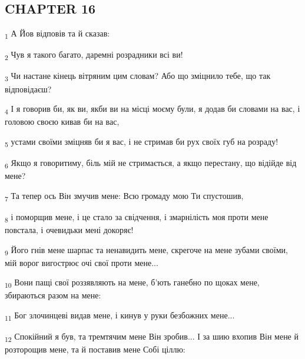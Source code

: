 \subsection{CHAPTER 16}
\begin{tcolorbox}
\textsubscript{1} А Йов відповів та й сказав:
\end{tcolorbox}
\begin{tcolorbox}
\textsubscript{2} Чув я такого багато, даремні розрадники всі ви!
\end{tcolorbox}
\begin{tcolorbox}
\textsubscript{3} Чи настане кінець вітряним цим словам? Або що зміцнило тебе, що так відповідаєш?
\end{tcolorbox}
\begin{tcolorbox}
\textsubscript{4} І я говорив би, як ви, якби ви на місці моєму були, я додав би словами на вас, і головою своєю кивав би на вас,
\end{tcolorbox}
\begin{tcolorbox}
\textsubscript{5} устами своїми зміцняв би я вас, і не стримав би рух своїх губ на розраду!
\end{tcolorbox}
\begin{tcolorbox}
\textsubscript{6} Якщо я говоритиму, біль мій не стримається, а якщо перестану, що відійде від мене?
\end{tcolorbox}
\begin{tcolorbox}
\textsubscript{7} Та тепер ось Він змучив мене: Всю громаду мою Ти спустошив,
\end{tcolorbox}
\begin{tcolorbox}
\textsubscript{8} і поморщив мене, і це стало за свідчення, і змарнілість моя проти мене повстала, і очевидьки мені докоряє!
\end{tcolorbox}
\begin{tcolorbox}
\textsubscript{9} Його гнів мене шарпає та ненавидить мене, скрегоче на мене зубами своїми, мій ворог вигострює очі свої проти мене...
\end{tcolorbox}
\begin{tcolorbox}
\textsubscript{10} Вони пащі свої роззявляють на мене, б'ють ганебно по щоках мене, збираються разом на мене:
\end{tcolorbox}
\begin{tcolorbox}
\textsubscript{11} Бог злочинцеві видав мене, і кинув у руки безбожних мене...
\end{tcolorbox}
\begin{tcolorbox}
\textsubscript{12} Спокійний я був, та тремтячим мене Він зробив... І за шию вхопив Він мене й розторощив мене, та й поставив мене Собі ціллю:
\end{tcolorbox}
